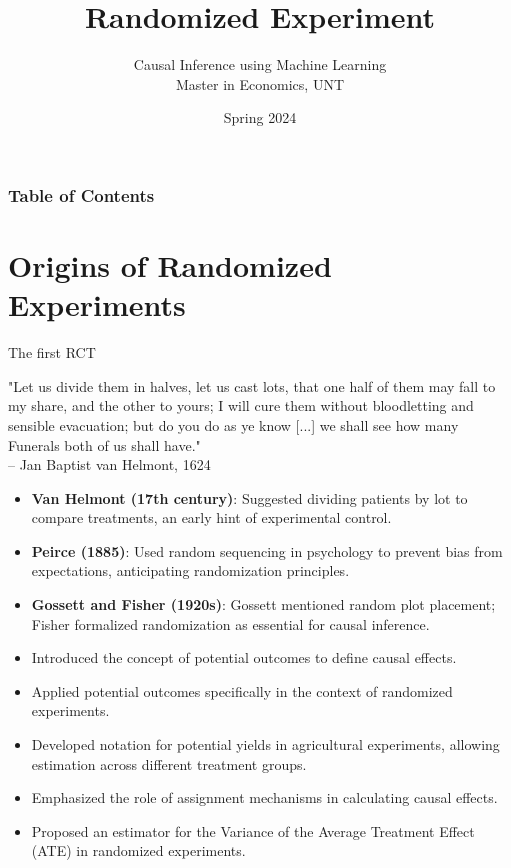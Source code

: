 \documentclass[xcolor=svgnames,t]{beamer}
\title[Randomized Experiment]{Randomized Experiment}
\subtitle{}
\author[CIML ]{Causal Inference using Machine Learning\\ Master in Economics, UNT}
\institute[]{Andres Mena}
\date{Spring 2024}
\begin{document}
\begin{frame}
\maketitle
\end{frame}


\begin{frame}
    \frametitle{Table of Contents}
    \tableofcontents
\end{frame}

\section{Origins of Randomized Experiments}
\begin{frame}{The first RCT}
    \begin{block}{}
        "Let us divide them in halves, let us cast lots, that one half of them may fall to my share, and the other to yours; I will cure them without bloodletting and sensible evacuation; but do you do as ye know [...] we shall see how many Funerals both of us shall have."\\
        – Jan Baptist van Helmont, 1624
    \end{block}
    \begin{itemize}[<+->]
        \item \textbf{Van Helmont (17th century)}: Suggested dividing patients by lot to compare treatments, an early hint of experimental control.
        \item \textbf{Peirce (1885)}: Used random sequencing in psychology to prevent bias from expectations, anticipating randomization principles.
        \item \textbf{Gossett and Fisher (1920s)}: Gossett mentioned random plot placement; Fisher formalized randomization as essential for causal inference.
    \end{itemize}
\end{frame}
\begin{frame}{ \cite{neyman1923}}
    \begin{itemize}[<+->]
        \item Introduced the concept of potential outcomes to define causal effects.
        \item Applied potential outcomes specifically in the context of randomized experiments.
        \item Developed notation for potential yields in agricultural experiments, allowing estimation across different treatment groups.
        \item Emphasized the role of assignment mechanisms in calculating causal effects.
        \item Proposed an estimator for the Variance of the Average Treatment Effect (ATE) in randomized experiments.
    \end{itemize}
\end{frame}
\end{document}
